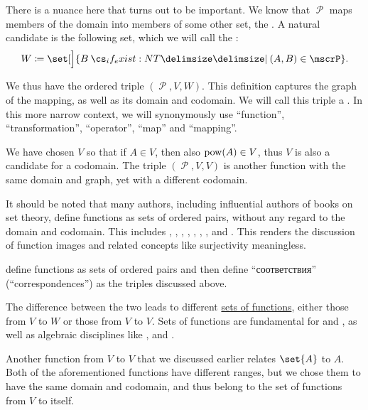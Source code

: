 \begin{remark}
  There is a nuance here that turns out to be important. We know that \( \mscrP \) maps members of the domain into members of some other set, the . A natural candidate is the following set, which we will call the :
  \begin{equation*}
    W \coloneqq \set[\Big]{ B \given* (A, B) \in \mscrP }.
  \end{equation*}

  We thus have the ordered triple \( (\mscrP, V, W) \). This definition captures the graph of the mapping, as well as its domain and codomain. We will call this triple a . In this more narrow context, we will synonymously use \enquote{function}, \enquote{transformation}, \enquote{operator}, \enquote{map} and \enquote{mapping}.

  We have chosen \( V \) so that if \( A \in V \), then also \( \operatorname{pow}(A) \in V \), thus \( V \) is also a candidate for a codomain. The triple \( (\mscrP, V, V) \) is another function with the same domain and graph, yet with a different codomain.

  It should be noted that many authors, including influential authors of books on set theory, define functions as sets of ordered pairs, without any regard to the domain and codomain. This includes
  ,
  ,
  ,
  ,
  ,
  ,
  ,
   and
  . This renders the discussion of function images and related concepts like surjectivity meaningless.

   define functions as sets of ordered pairs and then define \enquote{соответствия} (\enquote{correspondences}) as the triples discussed above.

  The difference between the two leads to different \hyperref[def:set_of_all_functions]{sets of functions}, either those from \( V \) to \( W \) or those from \( V \) to \( V \). Sets of functions are fundamental for  and , as well as algebraic disciplines like ,  and .

  Another function from \( V \) to \( V \) that we discussed earlier relates \( \set{ A } \) to \( A \). Both of the aforementioned functions have different ranges, but we chose them to have the same domain and codomain, and thus belong to the set of functions from \( V \) to itself.


\end{remark}
